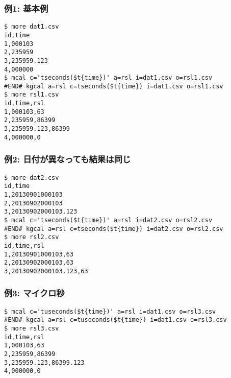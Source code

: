 \subsubsection*{例1: 基本例}



\begin{Verbatim}[baselinestretch=0.7,frame=single]
$ more dat1.csv
id,time
1,000103
2,235959
3,235959.123
4,000000
$ mcal c='tseconds($t{time})' a=rsl i=dat1.csv o=rsl1.csv
#END# kgcal a=rsl c=tseconds($t{time}) i=dat1.csv o=rsl1.csv
$ more rsl1.csv
id,time,rsl
1,000103,63
2,235959,86399
3,235959.123,86399
4,000000,0
\end{Verbatim}
\subsubsection*{例2: 日付が異なっても結果は同じ}



\begin{Verbatim}[baselinestretch=0.7,frame=single]
$ more dat2.csv
id,time
1,20130901000103
2,20130902000103
3,20130902000103.123
$ mcal c='tseconds($t{time})' a=rsl i=dat2.csv o=rsl2.csv
#END# kgcal a=rsl c=tseconds($t{time}) i=dat2.csv o=rsl2.csv
$ more rsl2.csv
id,time,rsl
1,20130901000103,63
2,20130902000103,63
3,20130902000103.123,63
\end{Verbatim}
\subsubsection*{例3: マイクロ秒}



\begin{Verbatim}[baselinestretch=0.7,frame=single]
$ mcal c='tuseconds($t{time})' a=rsl i=dat1.csv o=rsl3.csv
#END# kgcal a=rsl c=tuseconds($t{time}) i=dat1.csv o=rsl3.csv
$ more rsl3.csv
id,time,rsl
1,000103,63
2,235959,86399
3,235959.123,86399.123
4,000000,0
\end{Verbatim}
